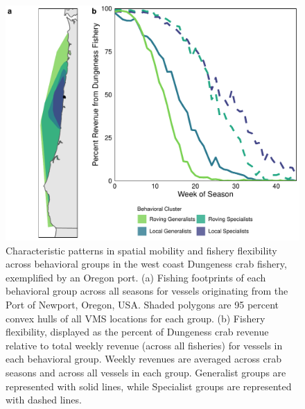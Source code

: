 \documentclass[]{elsarticle} %
\begin{document}
\begin{figure}%
\includegraphics [width=\linewidth]{groups_mobility_flexibility.pdf}
\caption{Characteristic patterns in spatial mobility and fishery flexibility across behavioral groups in the west coast Dungeness crab fishery, exemplified by an Oregon port. (a) Fishing footprints of each behavioral group across all seasons for vessels originating from the Port of Newport, Oregon, USA. Shaded polygons are 95 percent convex hulls of all VMS locations for each group. (b) Fishery flexibility, displayed as the percent of Dungeness crab revenue relative to total weekly revenue (across all fisheries) for vessels in each behavioral group. Weekly revenues are averaged across crab seasons and across all vessels in each group. Generalist groups are represented with solid lines, while Specialist groups are represented with dashed lines.}
\label{fig:characteristics}
\end{figure}
\end{document}
